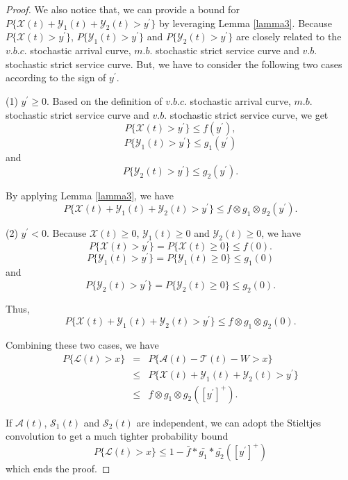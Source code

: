 \documentclass[12pt]{article}
\newtheorem{proof}{Proof}
\begin{document}
\begin{proof}
We also notice that, we can provide a bound for $P\{\mathcal{X}(t)+\mathcal{Y}_1(t)+\mathcal{Y}_2(t)>y^\prime\}$ by leveraging Lemma \ref{lamma3}. Because $P\{\mathcal{X}(t)>y^\prime\}$, $P\{\mathcal{Y}_1(t)>y^\prime\}$ and $P\{\mathcal{Y}_2(t)>y^\prime\}$ are closely related to the $v.b.c.$ stochastic arrival curve, $m.b.$ stochastic strict service curve and $v.b.$ stochastic strict service curve. But, we have to consider the following two cases according to the sign of $y^\prime$.

(1) $y^\prime\geq 0$. Based on the definition of $v.b.c.$ stochastic arrival curve, $m.b.$ stochastic strict service curve and $v.b.$ stochastic strict service curve, we get
$$P\{\mathcal{X}(t)>y^\prime\}\leq f(y^\prime),$$
$$P\{\mathcal{Y}_1(t)>y^\prime\}\leq g_1(y^\prime)$$
and
$$P\{\mathcal{Y}_2(t)>y^\prime\}\leq g_2(y^\prime).$$

By applying Lemma \ref{lamma3}, we have
\begin{equation}\label{equation1}
P\{\mathcal{X}(t)+\mathcal{Y}_1(t)+\mathcal{Y}_2(t)>y^\prime\}\leq f\otimes g_1\otimes g_2(y^\prime).
\end{equation}

(2) $y^\prime<0$. Because $\mathcal{X}(t)\geq 0$, $\mathcal{Y}_1(t)\geq 0$ and $\mathcal{Y}_2(t)\geq 0$, we have
$$P\{\mathcal{X}(t)>y^\prime\}=P\{\mathcal{X}(t)\geq 0\}\leq f(0).$$
$$P\{\mathcal{Y}_1(t)>y^\prime\}=P\{\mathcal{Y}_1(t)\geq 0\}\leq g_1(0)$$
and
$$P\{\mathcal{Y}_2(t)>y^\prime\}=P\{\mathcal{Y}_2(t)\geq 0\}\leq g_2(0).$$

Thus,
\begin{equation}\label{equation2}
P\{\mathcal{X}(t)+\mathcal{Y}_1(t)+\mathcal{Y}_2(t)>y^\prime\}\leq f\otimes g_1\otimes g_2(0).
\end{equation}

Combining these two cases, we have
\begin{eqnarray*}
  P\{\mathcal{L}(t)>x\}&=&P\{\mathcal{A}(t)-\mathcal{T}(t)-W>x\}\\
  &\leq&P\{\mathcal{X}(t)+\mathcal{Y}_1(t)+\mathcal{Y}_2(t)>y^\prime\}\\
  &\leq& f\otimes g_1\otimes g_2([y^\prime]^+).
\end{eqnarray*}

If $\mathcal{A}(t)$, $\mathcal{S}_1(t)$ and $\mathcal{S}_2(t)$ are independent, we can adopt the Stieltjes convolution to get a much tighter probability bound
$$P\{\mathcal{L}(t)>x\}\leq 1-\bar{f}\ast\bar{g_1}\ast\bar{g_2}([y^\prime]^+)$$
which ends the proof.
\end{proof}
\end{document}
